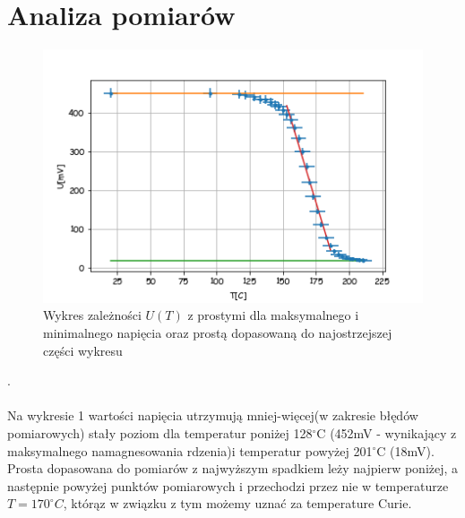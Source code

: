 \documentclass[a4paper,10pt]{article}
\begin{document}
\section{Analiza pomiarów}
\begin{figure}[H]
  \includegraphics{./Curie_proste.png}
  \caption{Wykres zależności $U(T)$ z prostymi dla maksymalnego i minimalnego napięcia oraz prostą dopasowaną do najostrzejszej części wykresu}
\end{figure}.
\\
\\Na wykresie 1 wartości napięcia utrzymują mniej-więcej(w zakresie błędów pomiarowych) stały poziom dla temperatur poniżej 128$^\circ$C (452mV - wynikający z maksymalnego namagnesowania rdzenia)i temperatur powyżej 201$^\circ$C (18mV). Prosta dopasowana do pomiarów z najwyższym spadkiem leży najpierw poniżej, a następnie powyżej punktów pomiarowych i przechodzi przez nie w temperaturze $T = 170^\circ C$, którąz w związku z tym możemy uznać za temperature Curie.
\end{document}
